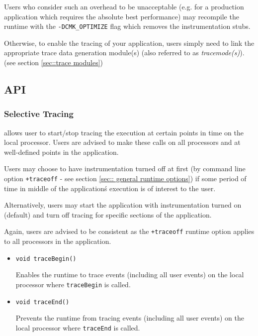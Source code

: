 \documentclass[10pt,dvips]{article}
\begin{document}
Users who consider such an overhead to be unacceptable (e.g. for a
production application which requires the absolute best performance)
may recompile the \charmpp{} runtime with the {\tt -DCMK\_OPTIMIZE}
flag which removes the instrumentation stubs.

Otherwise, to enable the tracing of your application, users simply
need to link the appropriate trace data generation module(s) (also
referred to as {\em tracemode(s)}). (see section \ref{sec::trace modules})

\subsection{\projections{} API}
\label{sec::api}

\subsubsection{Selective Tracing}

\charmpp{} allows user to start/stop tracing the execution at certain
points in time on the local processor. Users are advised to make these
calls on all processors and at well-defined points in the application.

Users may choose to have instrumentation turned off at first (by
command line option {\tt +traceoff} - see section \ref{sec:: general
runtime options}) if some period of time in middle of the
application\'s execution is of interest to the user.

Alternatively, users may start the application with instrumentation
turned on (default) and turn off tracing for specific sections of the
application.

Again, users are advised to be consistent as the {\tt +traceoff}
runtime option applies to all processors in the application.

\begin{itemize}
\item
{\tt void traceBegin()}

Enables the runtime to trace events (including all user events) on the local processor where {\tt traceBegin} is called.

\item
{\tt void traceEnd()}

Prevents the runtime from tracing events (including all user events) on the local processor where {\tt traceEnd} is called.

\end{itemize}
\end{document}
